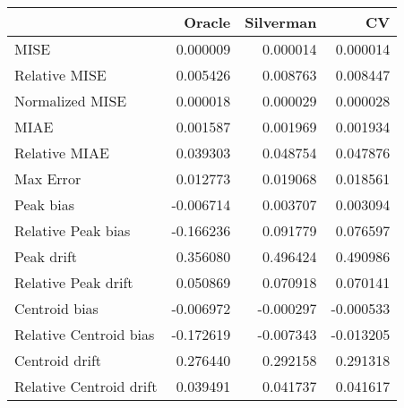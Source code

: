 \begin{tabular}{lrrr}
  \hline
 & Oracle & Silverman & CV \\ 
  \hline
MISE & 0.000009 & 0.000014 & 0.000014 \\ 
  Relative MISE & 0.005426 & 0.008763 & 0.008447 \\ 
  Normalized MISE & 0.000018 & 0.000029 & 0.000028 \\ 
  MIAE & 0.001587 & 0.001969 & 0.001934 \\ 
  Relative MIAE & 0.039303 & 0.048754 & 0.047876 \\ 
  Max Error & 0.012773 & 0.019068 & 0.018561 \\ 
  Peak bias & -0.006714 & 0.003707 & 0.003094 \\ 
  Relative Peak bias & -0.166236 & 0.091779 & 0.076597 \\ 
  Peak drift & 0.356080 & 0.496424 & 0.490986 \\ 
  Relative Peak drift & 0.050869 & 0.070918 & 0.070141 \\ 
  Centroid bias & -0.006972 & -0.000297 & -0.000533 \\ 
  Relative Centroid bias & -0.172619 & -0.007343 & -0.013205 \\ 
  Centroid drift & 0.276440 & 0.292158 & 0.291318 \\ 
  Relative Centroid drift & 0.039491 & 0.041737 & 0.041617 \\ 
   \hline
\end{tabular}
